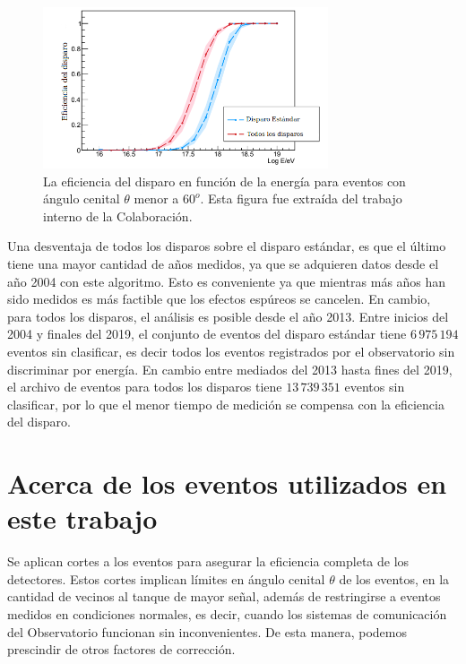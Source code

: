 \begin{figure}[H]
  \centering
  \includegraphics[width=0.75\textwidth]{comparacion_triggers.png}
  \caption{La eficiencia del disparo en función de la energía para eventos con ángulo cenital $\theta$ menor a $60^o$. Esta figura fue extraída del trabajo interno de la Colaboración.}
  \label{fig:triggers}
\end{figure}


Una desventaja de todos los disparos sobre el disparo estándar, es que el último tiene una mayor cantidad de años medidos, ya que se adquieren datos  desde el año 2004 con este algoritmo. Esto es conveniente ya que mientras más años han sido medidos es más factible que los efectos espúreos se cancelen. En cambio, para todos los disparos, el análisis  es posible desde el año 2013. Entre inicios del 2004 y finales del 2019, el conjunto de eventos del disparo estándar tiene $6\,975\,194$ eventos sin clasificar, es decir todos los eventos registrados por el observatorio sin discriminar por energía. En cambio entre mediados del 2013 hasta fines del 2019, el archivo de eventos para todos los disparos tiene $13\,739\,351$ eventos sin clasificar, por lo que el menor tiempo de medición se compensa con la eficiencia del disparo.


\section{Acerca de los eventos utilizados en este trabajo} \label{filtro}

Se aplican cortes a los eventos para asegurar la eficiencia completa de los detectores. Estos cortes implican límites en ángulo cenital $\theta$ de los eventos, en la cantidad de vecinos al tanque de mayor señal, además de restringirse a eventos medidos en condiciones normales, es decir, cuando los sistemas de comunicación del Observatorio funcionan sin inconvenientes. De esta manera, podemos prescindir de otros factores de corrección.

